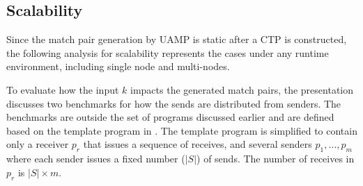 



\subsection{Scalability}
Since the match pair generation by UAMP is static after a CTP is constructed, the following analysis for scalability represents the cases under any runtime environment, including single node and multi-nodes.

To evaluate how the input $k$ impacts the generated match pairs, the presentation discusses two benchmarks for how the sends are distributed from senders. 
The benchmarks are outside the set of programs discussed earlier and are defined based on the template program in . The template program is simplified to contain only a receiver $p_r$ that issues a sequence of receives, and several senders $p_1,\ldots,p_m$ where each sender issues a fixed number ($|S|$) of sends. The number of receives in $p_r$ is $|S|\times m$.



